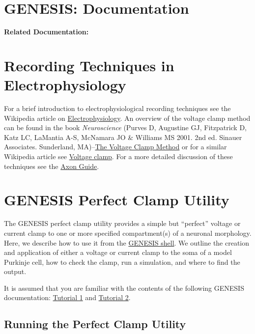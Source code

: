 \documentclass[12pt]{article}
\begin{document}
\section*{GENESIS: Documentation}

{\bf Related Documentation:}

\section*{Recording Techniques in Electrophysiology}

For a brief introduction to electrophysiological recording techniques see the Wikipedia article on \href{http://en.wikipedia.org/wiki/Electrophysiology#Current_clamp}{Electrophysiology}. An overview of the voltage clamp method can be found in the book {\it Neuroscience} (Purves D, Augustine GJ,  Fitzpatrick D, Katz LC, LaMantia A-S, McNamara JO \& Williams MS 2001. 2nd ed. Sinauer Associates. Sunderland, MA)--\href{http://www.ncbi.nlm.nih.gov/bookshelf/br.fcgi?book=neurosci&part=A174}{The Voltage Clamp Method} or for a similar Wikipedia article see \href{http://en.wikipedia.org/wiki/Voltage_clamp}{Voltage clamp}. For a more detailed discussion of these techniques see the \href{http://www.moleculardevices.com/pages/instruments/axon_guide.html}{Axon Guide}.

\section*{GENESIS Perfect Clamp Utility}

The GENESIS perfect clamp utility provides a simple but ``perfect'' voltage or current clamp to one or more specified compartment(s) of a neuronal morphology. Here, we describe how to use it from the \href{../gshell/gshell.tex}{GENESIS shell}. We outline the creation and application of either a voltage or current clamp to the soma of a model Purkinje cell, how to check the clamp, run a simulation, and where to find the output.

It is assumed that you are familiar with the contents of the following GENESIS documentation: \href{../tutorial1/tutorial1.tex}{Tutorial 1} and \href{../tutorial2/tutorial2.tex}{Tutorial 2}.

\subsection*{Running the Perfect Clamp Utility}
\end{document}
